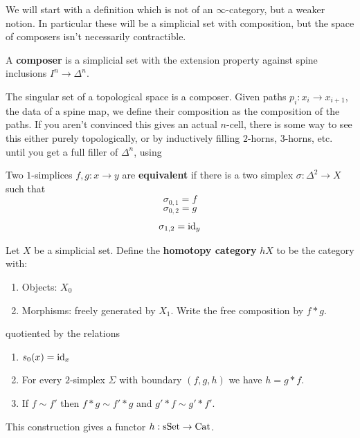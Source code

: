 We will start with a definition which is not of an $\infty$-category, but a weaker notion.
In particular these will be a simplicial set with composition, but the space of composers isn't necessarily contractible.

\begin{definition}
    A \textbf{composer} is a simplicial set with the extension property against spine inclusions $I^n \to \Delta^n$.
\end{definition}

\begin{example}
    The singular set of a topological space is a composer.
    Given paths $p_i : x_i \to x_{i+1}$, the data of a spine map, we define their composition as the composition of the paths.
    If you aren't convinced this gives an actual $n$-cell, there is some way to see this either purely topologically, or by inductively filling $2$-horns, $3$-horns, etc. until you get a full filler of $\Delta^n$, using 
\end{example}

\begin{definition}
    Two $1$-simplices $f, g : x \to y$ are \textbf{equivalent} if there is a two simplex
    $\sigma : \Delta^2 \to X$ such that
    \[ \sigma_{0,1} = f\]
    \[ \sigma_{0, 2} = g\]
    \[ \sigma_{1,2} = \mathrm{id}_y\]
\end{definition}

\begin{definition}
    Let $X$ be a simplicial set. 
    Define the \textbf{homotopy category} $hX$ to be the category with:
    \begin{enumerate}
        \item Objects: $X_0$
        \item Morphisms: freely generated by $X_1$. Write the free composition by $f \ast g$.
    \end{enumerate}
    quotiented by the relations
    \begin{enumerate}
        \item $s_0(x) = \mathrm{id}_x$
        \item For every $2$-simplex $\Sigma$ with boundary $(f,g,h)$ we have $h = g \ast f$.
        \item If $f \sim f'$ then $f \ast g \sim f' \ast g$ and $g' \ast f \sim g' \ast f'$. 
    \end{enumerate}
\end{definition}

This construction gives a functor $h : \mathrm{sSet} \to \mathrm{Cat}$.

